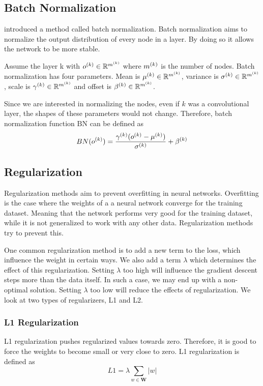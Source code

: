 \subsection{Batch Normalization}
\cite{ioffe2015batch} introduced a method called batch normalization. Batch normalization aims to normalize the output distribution of every node in a layer. By doing so it allows the network to be more stable. 

Assume the layer k with $o^{(k)} \in \mathbb{R}^{m^{(k)}}$ where $m^{(k)}$ is the number of nodes. Batch normalization has four parameters. Mean is $\mu^{(k)} \in \mathbb{R}^{m^{(k)}}$, variance is $\sigma^{(k)} \in \mathbb{R}^{m^{(k)}}$, scale is $\gamma^{(k)} \in \mathbb{R}^{m^{(k)}}$ and offset is $\beta^{(k)} \in \mathbb{R}^{m^{(k)}}$. 

Since we are interested in normalizing the nodes, even if $k$ was a convolutional layer, the shapes of these parameters would not change. Therefore, batch normalization function $\textrm{BN}$ can be defined as 
$$ BN(o^{(k)}) = \frac{\gamma^{(k)}(o^{(k)}-\mu^{(k)})}{\sigma^{(k)}}+\beta^{(k)} $$

\subsection{Regularization}
Regularization methods aim to prevent overfitting in neural networks. Overfitting is the case where the weights of a a neural network converge for the training dataset. Meaning that the network performs very good for the training dataset, while it is not generalized to work with any other data. Regularization methods try to prevent this.

One common regularization method is to add a new term to the loss, which influence the weight in certain ways. We also add a term $\lambda$ which determines the effect of this regularization. Setting $\lambda$ too high will influence the gradient descent steps more than the data itself. In such a case, we may end up with a non-optimal solution. Setting $\lambda$ too low will reduce the effects of regularization. We look at two types of regularizers, L1 and L2. 

\subsubsection{L1 Regularization}
L1 regularization pushes regularized values towards zero. Therefore, it is good to force the weights to become small or very close to zero. L1 regularization is defined as
$$ L1 = \lambda \sum_{w \in \mathbf{W}} |w| $$ 

